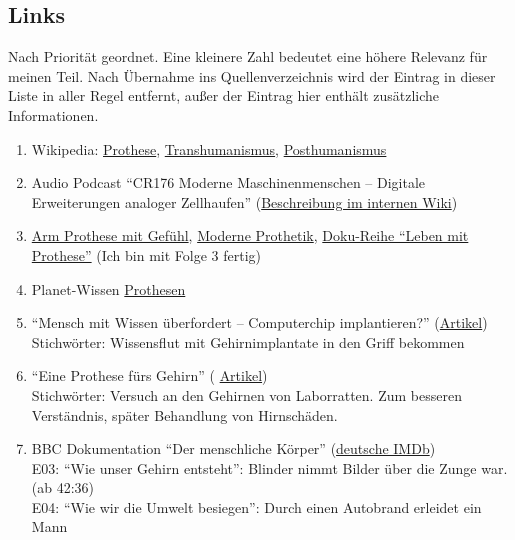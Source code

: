 \subsection*{Links}
Nach Priorität geordnet. Eine kleinere Zahl bedeutet eine höhere Relevanz für meinen Teil.
Nach Übernahme ins Quellenverzeichnis wird der Eintrag in dieser Liste in aller Regel entfernt,
außer der Eintrag hier enthält zusätzliche Informationen.
\begin{enumerate}
	\item Wikipedia: \href{http://de.wikipedia.org/wiki/Prothese}{Prothese},
		\href{http://de.wikipedia.org/wiki/Transhumanismus}{Transhumanismus},
		\href{http://de.wikipedia.org/wiki/Posthumanismus}{Posthumanismus}
	\item Audio Podcast \enquote{CR176 Moderne Maschinenmenschen -- Digitale Erweiterungen analoger
		Zellhaufen}
		(\href{https://wiki.chaosradio.ccc.de/Chaosradio_176}{Beschreibung im internen Wiki})
	\item \href{https://www.youtube.com/watch?v=EjcSosdtQ0k}{Arm Prothese mit Gefühl},
		\href{https://www.youtube.com/watch?v=KVDsO9NAgtE}{Moderne Prothetik},
		\href{https://www.youtube.com/watch?v=7bow1_k2LIg}{Doku-Reihe \enquote{Leben mit Prothese}}
		(Ich bin mit Folge 3 fertig)
	\item Planet-Wissen
		\href{http://www.planet-wissen.de/natur_technik/anatomie_mensch/prothesen/index.jsp}%
		{Prothesen}
	\item \enquote{Mensch mit Wissen überfordert – Computerchip implantieren?}
		(\href{http://www.heise.de/newsticker/meldung/Mensch-mit-Wissen-ueberfordert-Computerchip-implantieren-1405096.html}
		{Artikel}) \\
		Stichwörter: Wissensflut mit Gehirnimplantate in den Griff bekommen
	\item \enquote{Eine Prothese fürs Gehirn}
		(%
		\href{http://heise.de/-1365074}{Artikel}) \\
		Stichwörter: Versuch an den Gehirnen von Laborratten.
			Zum besseren Verständnis, später Behandlung von Hirnschäden.
	\item BBC Dokumentation \enquote{Der menschliche Körper}
		(\href{http://www.imdb.de/title/tt1929678/}{deutsche IMDb}) \\
		E03: \enquote{Wie unser Gehirn entsteht}: Blinder nimmt Bilder über die Zunge war.
			(ab 42:36) \\
		E04: \enquote{Wie wir die Umwelt besiegen}: Durch einen Autobrand erleidet ein Mann

\end{enumerate}
